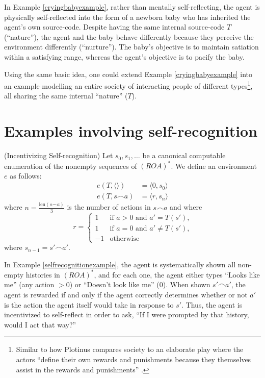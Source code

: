 \documentclass[runningheads]{llncs}
\begin{document}
In Example \ref{cryingbabyexample}, rather than mentally self-reflecting,
the agent is physically self-reflected into the form of a newborn baby
who has inherited the agent's own source-code. Despite having the same
internal source-code $T$ (``nature''), the agent and the baby behave
differently because they perceive the environment differently (``nurture'').
The baby's objective is to maintain satiation within a satisfying range,
whereas the agent's objective is to pacify the baby.

Using the same basic idea, one could extend Example \ref{cryingbabyexample}
into an example modelling an entire society of interacting people of different
types\footnote{Similar to how Plotinus compares society to an elaborate play
where the actors ``define their own rewards and punishments because
they themselves assist in the rewards and punishments'' \cite{plotinus}.},
all sharing the same internal ``nature'' ($T$).

\section{Examples involving self-recognition}

\begin{example}
\label{selfrecognitionexample}
    (Incentivizing Self-recognition)
    Let $s_0,s_1,\ldots$ be a canonical computable enumeration of
    the nonempty sequences of $(ROA)^*$.
    We define an environment $e$ as follows:
    \begin{align*}
        e(T,\langle\rangle) &= \langle 0, s_0\rangle\\
        e(T,s\frown a) &= \langle r, s_n\rangle
    \end{align*}
    where $n=\frac{\mbox{len}(s\frown a)}{3}$ is the number
    of actions in $s\frown a$ and where
    \[
        r =
        \begin{cases}
            1 &\mbox{if $a>0$ and $a'=T(s')$,}\\
            1 &\mbox{if $a=0$ and $a'\not=T(s')$,}\\
            -1 &\mbox{otherwise}
        \end{cases}
    \]
    where $s_{n-1}=s'\frown a'$.
\end{example}

In Example \ref{selfrecognitionexample}, the agent is systematically
shown all non-empty histories in $(ROA)^*$, and for
each one, the agent either types ``Looks like me'' (any action $>0$)
or ``Doesn't look like me'' ($0$). When shown
$s'\frown a'$, the agent is rewarded if and only if the agent
correctly determines whether or not $a'$
is the action the agent itself would take in response to $s'$.
Thus, the agent is incentivized to self-reflect in order to ask, ``If I were prompted
by that history, would I act that way?''
\end{document}
